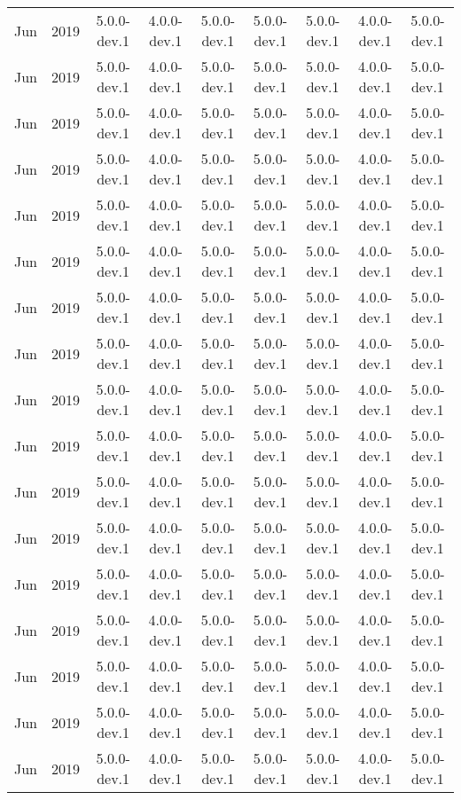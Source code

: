 \begin{xtabular}{|ll|c|c|c|c|c|c|c|}
Jun & 2019 & 5.0.0-dev.1 & 4.0.0-dev.1 & 5.0.0-dev.1 & 5.0.0-dev.1 & 5.0.0-dev.1 & 4.0.0-dev.1 & 5.0.0-dev.1 \\
Jun & 2019 & 5.0.0-dev.1 & 4.0.0-dev.1 & 5.0.0-dev.1 & 5.0.0-dev.1 & 5.0.0-dev.1 & 4.0.0-dev.1 & 5.0.0-dev.1 \\
Jun & 2019 & 5.0.0-dev.1 & 4.0.0-dev.1 & 5.0.0-dev.1 & 5.0.0-dev.1 & 5.0.0-dev.1 & 4.0.0-dev.1 & 5.0.0-dev.1 \\
Jun & 2019 & 5.0.0-dev.1 & 4.0.0-dev.1 & 5.0.0-dev.1 & 5.0.0-dev.1 & 5.0.0-dev.1 & 4.0.0-dev.1 & 5.0.0-dev.1 \\
Jun & 2019 & 5.0.0-dev.1 & 4.0.0-dev.1 & 5.0.0-dev.1 & 5.0.0-dev.1 & 5.0.0-dev.1 & 4.0.0-dev.1 & 5.0.0-dev.1 \\
Jun & 2019 & 5.0.0-dev.1 & 4.0.0-dev.1 & 5.0.0-dev.1 & 5.0.0-dev.1 & 5.0.0-dev.1 & 4.0.0-dev.1 & 5.0.0-dev.1 \\
Jun & 2019 & 5.0.0-dev.1 & 4.0.0-dev.1 & 5.0.0-dev.1 & 5.0.0-dev.1 & 5.0.0-dev.1 & 4.0.0-dev.1 & 5.0.0-dev.1 \\
Jun & 2019 & 5.0.0-dev.1 & 4.0.0-dev.1 & 5.0.0-dev.1 & 5.0.0-dev.1 & 5.0.0-dev.1 & 4.0.0-dev.1 & 5.0.0-dev.1 \\
Jun & 2019 & 5.0.0-dev.1 & 4.0.0-dev.1 & 5.0.0-dev.1 & 5.0.0-dev.1 & 5.0.0-dev.1 & 4.0.0-dev.1 & 5.0.0-dev.1 \\
Jun & 2019 & 5.0.0-dev.1 & 4.0.0-dev.1 & 5.0.0-dev.1 & 5.0.0-dev.1 & 5.0.0-dev.1 & 4.0.0-dev.1 & 5.0.0-dev.1 \\
Jun & 2019 & 5.0.0-dev.1 & 4.0.0-dev.1 & 5.0.0-dev.1 & 5.0.0-dev.1 & 5.0.0-dev.1 & 4.0.0-dev.1 & 5.0.0-dev.1 \\
Jun & 2019 & 5.0.0-dev.1 & 4.0.0-dev.1 & 5.0.0-dev.1 & 5.0.0-dev.1 & 5.0.0-dev.1 & 4.0.0-dev.1 & 5.0.0-dev.1 \\
Jun & 2019 & 5.0.0-dev.1 & 4.0.0-dev.1 & 5.0.0-dev.1 & 5.0.0-dev.1 & 5.0.0-dev.1 & 4.0.0-dev.1 & 5.0.0-dev.1 \\
Jun & 2019 & 5.0.0-dev.1 & 4.0.0-dev.1 & 5.0.0-dev.1 & 5.0.0-dev.1 & 5.0.0-dev.1 & 4.0.0-dev.1 & 5.0.0-dev.1 \\
Jun & 2019 & 5.0.0-dev.1 & 4.0.0-dev.1 & 5.0.0-dev.1 & 5.0.0-dev.1 & 5.0.0-dev.1 & 4.0.0-dev.1 & 5.0.0-dev.1 \\
Jun & 2019 & 5.0.0-dev.1 & 4.0.0-dev.1 & 5.0.0-dev.1 & 5.0.0-dev.1 & 5.0.0-dev.1 & 4.0.0-dev.1 & 5.0.0-dev.1 \\
Jun & 2019 & 5.0.0-dev.1 & 4.0.0-dev.1 & 5.0.0-dev.1 & 5.0.0-dev.1 & 5.0.0-dev.1 & 4.0.0-dev.1 & 5.0.0-dev.1 \\

\end{xtabular}
